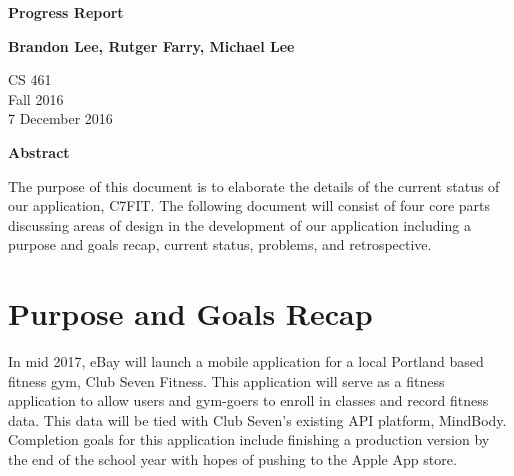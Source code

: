 \documentclass[letterpaper,10pt,titlepage]{article}
\begin{document}
\begin{titlepage}
    \begin{center}
        \vspace*{3.5cm}

        \textbf{Progress Report}

        \vspace{0.5cm}

        \textbf{Brandon Lee, Rutger Farry, Michael Lee}

        \vspace{0.8cm}

        CS 461\\
        Fall 2016\\
        7 December 2016\\

        \vspace{1cm}

        \textbf{Abstract}\\

        \vspace{0.5cm}

		The purpose of this document is to elaborate the details of the current status of our application, C7FIT. The following document will consist of four core parts discussing areas of design in the development of our application including a purpose and goals recap, current status, problems, and retrospective.
        \vfill

    \end{center}
\end{titlepage}

\newpage

\tableofcontents

\newpage

\section{Purpose and Goals Recap}

In mid 2017, eBay will launch a mobile application for a local Portland based fitness gym, Club Seven Fitness. This application will serve as a fitness application to allow users and gym-goers to enroll in classes and record fitness data. This data will be tied with Club Seven's existing API platform, MindBody.\\

Completion goals for this application include finishing a production version by the end of the school year with hopes of pushing to the Apple App store.
\end{document}
